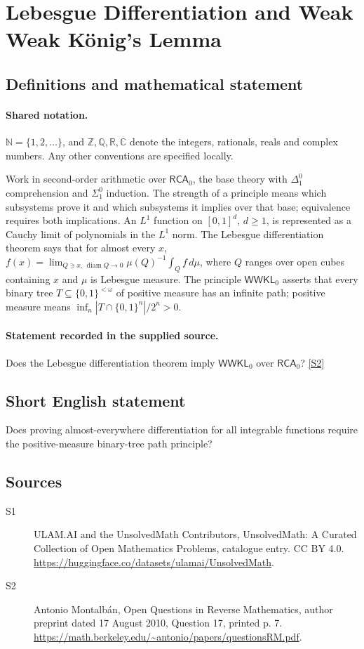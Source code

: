 \documentclass[11pt]{article}
\newcommand{\sref}[2]{\hyperlink{source:#1:#2}{[S#2]}}
\begin{document}
\section{Lebesgue Differentiation and Weak Weak König's Lemma}\label{statement}

\subsection{Definitions and mathematical statement}

\paragraph{Shared notation.}$\mathbb N=\{1,2,\ldots\}$, and $\mathbb Z,\mathbb Q,\mathbb R,\mathbb C$ denote the integers, rationals, reals and complex numbers. Any other conventions are specified locally.


Work in second-order arithmetic over $\mathsf{RCA}_0$, the base theory with $\Delta^0_1$ comprehension and $\Sigma^0_1$ induction. The strength of a principle means which subsystems prove it and which subsystems it implies over that base; equivalence requires both implications. An $L^1$ function on $[0,1]^d$, $d\geq1$, is represented as a Cauchy limit of polynomials in the $L^1$ norm. The Lebesgue differentiation theorem says that for almost every $x$, $f(x)=\lim_{Q\ni x,\,\operatorname{diam}Q\to0}\mu(Q)^{-1}\int_Qf\,d\mu$, where $Q$ ranges over open cubes containing $x$ and $\mu$ is Lebesgue measure. The principle $\mathsf{WWKL}_0$ asserts that every binary tree $T\subseteq\{0,1\}^{<\omega}$ of positive measure has an infinite path; positive measure means $\inf_n |T\cap\{0,1\}^n|/2^n>0$.
\paragraph{Statement recorded in the supplied source.}
Does the Lebesgue differentiation theorem imply $\mathsf{WWKL}_0$ over $\mathsf{RCA}_0$? \sref{statement}{2}
\subsection{Short English statement}
Does proving almost-everywhere differentiation for all integrable functions require the positive-measure binary-tree path principle?
\subsection{Sources}
\begin{description}
\item[\hypertarget{source:statement:1}{S1}] ULAM.AI and the UnsolvedMath Contributors, UnsolvedMath: A Curated Collection of Open Mathematics Problems, catalogue entry. CC BY 4.0. \url{https://huggingface.co/datasets/ulamai/UnsolvedMath}.
\item[\hypertarget{source:statement:2}{S2}] Antonio Montalbán, Open Questions in Reverse Mathematics, author preprint dated 17 August 2010, Question 17, printed p. 7. \url{https://math.berkeley.edu/~antonio/papers/questionsRM.pdf}.
\end{description}
\label{end:statement}
\end{document}
